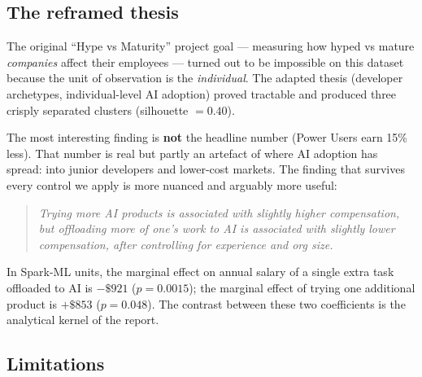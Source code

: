\documentclass[11pt,a4paper]{article}
\begin{document}
\subsection{The reframed thesis}

The original ``Hype vs Maturity'' project goal --- measuring how hyped vs
mature \emph{companies} affect their employees --- turned out to be
impossible on this dataset because the unit of observation is the
\emph{individual}. The adapted thesis (developer archetypes,
individual-level AI adoption) proved tractable and produced three crisply
separated clusters (silhouette $= 0.40$).

The most interesting finding is \textbf{not} the headline number (Power
Users earn 15\% less). That number is real but partly an artefact of
where AI adoption has spread: into junior developers and lower-cost
markets. The finding that survives every control we apply is more nuanced
and arguably more useful:

\begin{quote}\itshape
  Trying more AI products is associated with slightly higher
  compensation, but offloading more of one's work to AI is associated
  with slightly lower compensation, after controlling for experience
  and org size.
\end{quote}

In Spark-ML units, the marginal effect on annual salary of a single
extra task offloaded to AI is $-\$921$ ($p=0.0015$); the marginal effect
of trying one additional product is $+\$853$ ($p=0.048$). The contrast
between these two coefficients is the analytical kernel of the report.

\subsection{Limitations}
\end{document}
